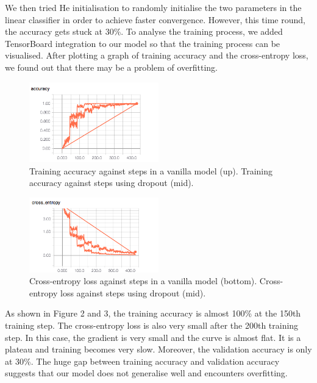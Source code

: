 \documentclass[letterpaper, 12pt]{article}
\begin{document}
We then tried He initialisation to randomly initialise the two parameters in the linear classifier in order to
achieve faster convergence. However, this time round, the accuracy gets stuck at 30\%. To analyse the training process,
we added TensorBoard integration to our model so that the training process can be visualised. After plotting a graph
of training accuracy and the cross-entropy loss, we found out that there may be a problem of overfitting.
\begin{figure}
    \begin{center}
        \includegraphics[width=0.5\textwidth]{training_accuracy}
        \caption{Training accuracy against steps in a vanilla model (up). Training accuracy against steps using dropout (mid).}
    \end{center}
\end{figure}

\begin{figure}
    \begin{center}
        \includegraphics[width=0.5\textwidth]{cross_entropy}
        \caption{Cross-entropy loss against steps in a vanilla model (bottom). Cross-entropy loss against steps using dropout (mid).}
    \end{center}
\end{figure}

As shown in Figure 2 and 3, the training accuracy is almost 100\% at the 150th training step. The cross-entropy loss is also
very small after the 200th training step. In this case, the gradient is very small and the curve is almost flat. It is
a plateau and training becomes very slow. Moreover, the validation accuracy is only at 30\%. The huge gap between training
accuracy and validation accuracy suggests that our model does not generalise well and encounters overfitting.
\end{document}
